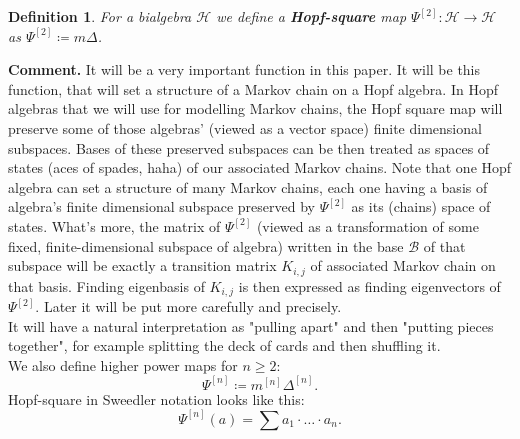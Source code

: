 \documentclass[a4paper, 12pt]{article}
\newtheorem{definition}{Definition}
\begin{document}
\begin{definition}
For a bialgebra $\mathcal{H}$ we define a \textbf{Hopf-square} map
$\Psi^{[2]} : \mathcal{H} \to \mathcal{H}$ as $\Psi^{[2]} \coloneqq m\Delta$.
\end{definition}
\textbf{Comment. } It will be a very important function in this paper. It will be this function, that will
set a structure
of a Markov chain on a Hopf algebra. In Hopf algebras that we will
use for modelling Markov chains, the Hopf square map will preserve some of those algebras'
(viewed as a vector space) finite dimensional subspaces. Bases of these preserved
subspaces can be then treated as spaces of states (aces of spades, haha)
of our associated Markov chains. Note that one Hopf algebra can set a structure of many Markov chains,
each one having a basis of algebra's finite dimensional subspace preserved by $\Psi^{[2]}$ as its (chains)
space of states.
What's more, the matrix of $\Psi^{[2]}$ (viewed as a transformation of some fixed, finite-dimensional
subspace of algebra)
written in the base $\mathcal{B}$ of that subspace will be exactly a transition matrix
$K_{i,j}$ of associated Markov chain on that basis. Finding eigenbasis of $K_{i,j}$ is then expressed as
finding eigenvectors of $\Psi^{[2]}$. Later it will be put more carefully and precisely. \\
It will have a natural interpretation as "pulling apart" and then "putting pieces together", for
example splitting the deck of cards and then shuffling it. \\[4pt]
We also define higher power maps for $n \geq 2$:
\begin{equation*}
\Psi^{[n]} \coloneqq m^{[n]}\Delta^{[n]}.
\end{equation*}
Hopf-square in Sweedler notation looks like this:
\begin{equation*}
\Psi^{[n]}(a) = \sum a_1 \cdot \ldots \cdot a_n.
\end{equation*}
\end{document}
